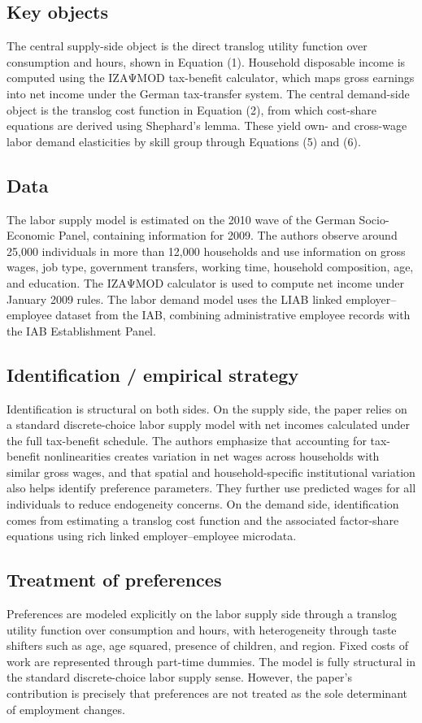 \documentclass[11pt,a4paper]{article}
\begin{document}
\subsection*{Key objects}
The central supply-side object is the direct translog utility function over consumption and hours, shown in Equation (1). Household disposable income is computed using the IZAΨMOD tax-benefit calculator, which maps gross earnings into net income under the German tax-transfer system. The central demand-side object is the translog cost function in Equation (2), from which cost-share equations are derived using Shephard’s lemma. These yield own- and cross-wage labor demand elasticities by skill group through Equations (5) and (6).

\subsection*{Data}
The labor supply model is estimated on the 2010 wave of the German Socio-Economic Panel, containing information for 2009. The authors observe around 25,000 individuals in more than 12,000 households and use information on gross wages, job type, government transfers, working time, household composition, age, and education. The IZAΨMOD calculator is used to compute net income under January 2009 rules. The labor demand model uses the LIAB linked employer–employee dataset from the IAB, combining administrative employee records with the IAB Establishment Panel.

\subsection*{Identification / empirical strategy}
Identification is structural on both sides. On the supply side, the paper relies on a standard discrete-choice labor supply model with net incomes calculated under the full tax-benefit schedule. The authors emphasize that accounting for tax-benefit nonlinearities creates variation in net wages across households with similar gross wages, and that spatial and household-specific institutional variation also helps identify preference parameters. They further use predicted wages for all individuals to reduce endogeneity concerns. On the demand side, identification comes from estimating a translog cost function and the associated factor-share equations using rich linked employer–employee microdata.

\subsection*{Treatment of preferences}
Preferences are modeled explicitly on the labor supply side through a translog utility function over consumption and hours, with heterogeneity through taste shifters such as age, age squared, presence of children, and region. Fixed costs of work are represented through part-time dummies. The model is fully structural in the standard discrete-choice labor supply sense. However, the paper’s contribution is precisely that preferences are not treated as the sole determinant of employment changes.
\end{document}
